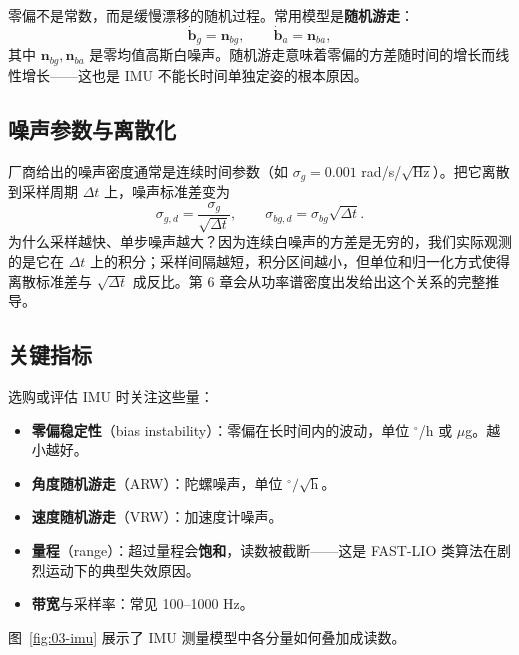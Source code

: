 零偏不是常数，而是缓慢漂移的随机过程。常用模型是\textbf{随机游走}：
\begin{equation}
\dot{\bm{b}}_g=\bm{n}_{bg},\qquad \dot{\bm{b}}_a=\bm{n}_{ba},
\label{eq:03-bias-rw}
\end{equation}
其中 $\bm{n}_{bg},\bm{n}_{ba}$ 是零均值高斯白噪声。随机游走意味着零偏的方差随时间的增长而线性增长——这也是 IMU 不能长时间单独定姿的根本原因。

\subsection{噪声参数与离散化}

厂商给出的噪声密度通常是连续时间参数（如 $\sigma_g=0.001$ rad/s/$\sqrt{\text{Hz}}$）。把它离散到采样周期 $\Delta t$ 上，噪声标准差变为
\begin{equation}
\sigma_{g,d}=\frac{\sigma_g}{\sqrt{\Delta t}},\qquad \sigma_{bg,d}=\sigma_{bg}\sqrt{\Delta t}.
\label{eq:03-discrete}
\end{equation}
为什么采样越快、单步噪声越大？因为连续白噪声的方差是无穷的，我们实际观测的是它在 $\Delta t$ 上的积分；采样间隔越短，积分区间越小，但单位和归一化方式使得离散标准差与 $\sqrt{\Delta t}$ 成反比。第 6 章会从功率谱密度出发给出这个关系的完整推导。

\subsection{关键指标}

选购或评估 IMU 时关注这些量：
\begin{itemize}
  \item \textbf{零偏稳定性}（bias instability）：零偏在长时间内的波动，单位 $^\circ$/h 或 $\mu$g。越小越好。
  \item \textbf{角度随机游走}（ARW）：陀螺噪声，单位 $^\circ/\sqrt{\text{h}}$。
  \item \textbf{速度随机游走}（VRW）：加速度计噪声。
  \item \textbf{量程}（range）：超过量程会\textbf{饱和}，读数被截断——这是 FAST-LIO 类算法在剧烈运动下的典型失效原因。
  \item \textbf{带宽}与采样率：常见 100--1000 Hz。
\end{itemize}

图~\ref{fig:03-imu} 展示了 IMU 测量模型中各分量如何叠加成读数。

